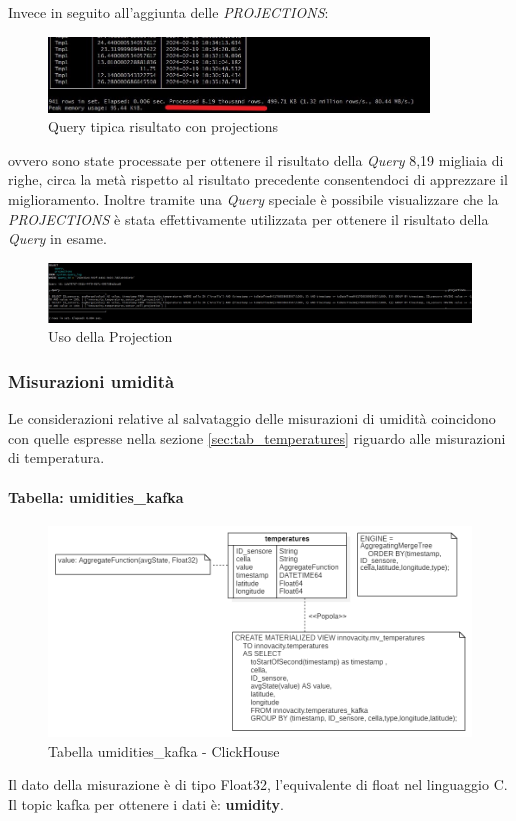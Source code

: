       Invece in seguito all'aggiunta delle \textit{PROJECTIONS}:
      \begin{figure}[H]
        \centering
        \includegraphics[width=0.9\textwidth]{../Images/SpecificaTecnica/ConProjectionRisultato.jpg}
        \caption{Query tipica risultato con projections}
        \label{fig:ProjectionsQueryWith}
      \end{figure}   
  ovvero sono state processate per ottenere il risultato della \textit{Query} 8,19 migliaia di righe, circa la metà rispetto al risultato precedente consentendoci di apprezzare il miglioramento.
Inoltre tramite una \textit{Query} speciale è possibile visualizzare che la \textit{PROJECTIONS} è stata effettivamente utilizzata per ottenere il risultato della \textit{Query} in esame.
\begin{figure}[H]
    \centering
    \includegraphics[width=1\textwidth]{../Images/SpecificaTecnica/ProjectionUsedByClickHouse.jpg}
    \caption{Uso della Projection}
    \label{fig:ProjectionsUsed}
\end{figure}

\subsubsection{Misurazioni umidità}
Le considerazioni relative al salvataggio delle misurazioni di umidità coincidono con quelle espresse nella sezione \ref{sec:tab_temperatures} riguardo alle misurazioni di temperatura.
\paragraph{Tabella: umidities\_kafka}
\begin{figure}[H]
    \centering
    \includegraphics[width=1\textwidth]{../Images/SpecificaTecnica/temperatures.PNG}
    \caption{Tabella umidities\_kafka - ClickHouse}
    \label{fig:umidities_kafka}
  \end{figure}
Il dato della misurazione è di tipo Float32, l’equivalente di float nel linguaggio C. Il topic
kafka per ottenere i dati è: \textbf{umidity}.
